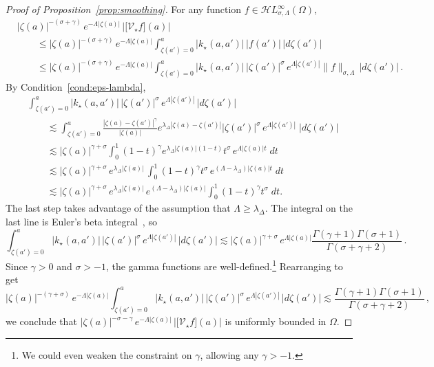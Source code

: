 \documentclass{article}
\theoremstyle{definition}
\theoremstyle{plain}
\newcommand{\singexp}[2]{\mathcal{H}L^\infty_{#1, #2}}
\newcommand{\softpart}{\mathcal{V}_\star}
\newcommand{\softker}{k_\star}
\newcommand{\domain}{\Omega}
\newenvironment{revtwo}{\color{revred}}{\color{black}}
\newenvironment{revtwo}{}{}
\begin{document}
\begin{proof}[Proof of Proposition~\ref{prop:smoothing}]
For any function $f\in\singexp{\sigma}{\Lambda}(\domain)$,
\begin{revtwo}
\begin{align*}
& |\zeta(a)|^{-(\sigma+\gamma)} \, e^{-\Lambda |\zeta(a)|} \, \Big \vert \big[ \softpart f\big](a)\Big\vert \\
& \qquad \leq |\zeta(a)|^{-(\sigma+\gamma)}\, e^{-\Lambda |\zeta(a)|} \int_{\zeta(a')=0}^a |\softker(a,a')|\, |f(a')| \, |d\zeta(a')| \\
& \qquad \leq |\zeta(a)|^{-(\sigma+\gamma)}\, e^{-\Lambda |\zeta(a)|} \int_{\zeta(a')=0}^a |\softker(a,a')|\, |\zeta(a')|^{\sigma}\, e^{\Lambda |\zeta(a')|} \|f\|_{\sigma,\Lambda} \, |d\zeta(a')|\,.
\end{align*}
\end{revtwo}
By Condition~\eqref{cond:eps-lambda},
\begin{revtwo}
\begin{align*}
& \int_{\zeta(a')=0}^a |\softker(a,a')|\, |\zeta(a')|^{\sigma}\, e^{\Lambda |\zeta(a')|} \, |d\zeta(a')| \\
& \qquad \lesssim \int_{\zeta(a')=0}^a \frac{|\zeta(a)-\zeta(a')|^\gamma}{|\zeta(a)|} e^{\lambda_\Delta |\zeta(a)-\zeta(a')|} |\zeta(a')|^{\sigma}\, e^{\Lambda|\zeta(a')|}\;|d\zeta(a')|\\
& \qquad \lesssim |\zeta(a)|^{\gamma+\sigma} \int_{0}^1 (1-t)^\gamma e^{\lambda_\Delta |\zeta(a)|(1-t)} t^{\sigma}\, e^{\Lambda|\zeta(a)| t}\;dt\\
& \qquad \lesssim |\zeta(a)|^{\gamma+\sigma}\, e^{\lambda_\Delta |\zeta(a)|}\,  \int_{0}^1 (1-t)^\gamma  t^{\sigma}\,e^{(\Lambda-\lambda_\Delta)|\zeta(a)| t}\;dt\\
& \qquad \lesssim |\zeta(a)|^{\gamma+\sigma}\, e^{\lambda_\Delta |\zeta(a)|}\,e^{(\Lambda-\lambda_\Delta)|\zeta(a)|}\int_{0}^1 (1-t)^\gamma  t^{\sigma}\;dt.
\end{align*}
\end{revtwo}
The last step takes advantage of the assumption that $\Lambda \ge \lambda_\Delta$. The integral on the last line is Euler's beta integral~\cite[equation~5.12.1]{dlmf}, so
\begin{revtwo}
\[ \int_{\zeta(a')=0}^a |\softker(a, a')|\, |\zeta(a')|^{\sigma}\, e^{\Lambda |\zeta(a')|} \, |d\zeta(a')| \lesssim |\zeta(a)|^{\gamma+\sigma}\, e^{\Lambda |\zeta(a)|} \frac{\Gamma(\gamma+1)\Gamma(\sigma+1)}{\Gamma(\sigma+\gamma+2)}\,. \]
\end{revtwo}
Since $\gamma > 0$ and $\sigma > -1$, the gamma functions are well-defined.\footnote{We could even weaken the constraint on $\gamma$, allowing any $\gamma > -1$.} Rearranging to get
\begin{revtwo}
\[ |\zeta(a)|^{-(\gamma+\sigma)}\, e^{-\Lambda |\zeta(a)|} \int_{\zeta(a')=0}^a |\softker(a,a')|\, |\zeta(a')|^{\sigma}\, e^{\Lambda |\zeta(a')|} \, |d\zeta(a')| \lesssim \frac{\Gamma(\gamma+1)\Gamma(\sigma+1)}{\Gamma(\sigma+\gamma+2)}\,, \]    
\end{revtwo}
we conclude that $|\zeta(a)|^{-\sigma-\gamma} \, e^{-\Lambda |\zeta(a)|} \, \Big \vert \big[ \softpart f\big](a)\Big\vert$ is uniformly bounded in $\domain$. 
\end{proof}
\end{document}
